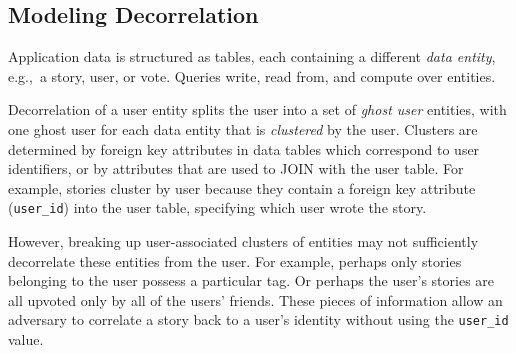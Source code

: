 \subsection{Modeling Decorrelation}
Application data is structured as tables, each containing a different \emph{data entity}, e.g.,\ a
story, user, or vote.  
Queries write, read
from, and compute over entities. 

Decorrelation of a user entity splits the user into a set of \emph{ghost user} entities, with one
ghost user for each data entity that is \emph{clustered} by the user.  Clusters are determined by
foreign key attributes in data tables which correspond to user identifiers, or by attributes that
are used to JOIN with the user table.  For example, stories cluster by user because they contain a
foreign key attribute (\texttt{user\_id}) into the user table, specifying which user wrote the
story.

However, breaking up user-associated clusters of entities may not sufficiently decorrelate these
entities from the user. For example, perhaps only stories belonging to the user possess a particular
tag. Or perhaps the user's stories are all upvoted only by all of the users'
friends. These pieces of information allow an adversary to correlate a story back to a user's
identity without using the \texttt{user\_id} value. 

